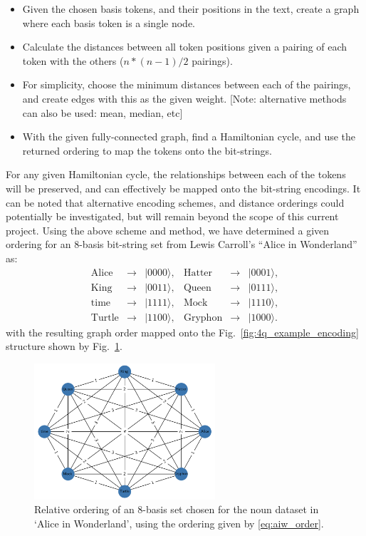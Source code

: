 \begin{itemize}
    \item Given the chosen basis tokens, and their positions in the text, create a graph where each basis token is a single node.
    \item Calculate the distances between all token positions given a pairing of each token with the others ($n*(n-1)/2$ pairings).
    \item For simplicity, choose the minimum distances between each of the pairings, and create edges with this as the given weight. [Note: alternative methods can also be used: mean, median, etc]
    \item With the given fully-connected graph, find a Hamiltonian cycle, and use the returned ordering to map the tokens onto the bit-strings.
\end{itemize}

For any given Hamiltonian cycle, the relationships between each of the tokens will be preserved, and can effectively be mapped onto the bit-string encodings. It can be noted that alternative encoding schemes, and distance orderings could potentially be investigated, but will remain beyond the scope of this current project. Using the above scheme and method, we have determined a given ordering for an 8-basis bit-string set from Lewis Carroll's ``Alice in Wonderland'' as:
\begin{equation}
\begin{array}{cccccc}
\textrm{Alice} & \rightarrow & \vert 0000\rangle, & \textrm{Hatter} & \rightarrow &\vert 0001\rangle, \\
\textrm{King} & \rightarrow & \vert 0011 \rangle, & \textrm{Queen} & \rightarrow &\vert 0111\rangle, \\
\textrm{time} & \rightarrow & \vert 1111 \rangle, &\textrm{Mock} & \rightarrow &\vert 1110\rangle, \\
\textrm{Turtle} & \rightarrow & \vert 1100\rangle, &\textrm{Gryphon} & \rightarrow &\vert 1000\rangle.
\end{array}
\label{eq:aiw_order}
\end{equation}
 with the resulting graph order mapped onto the Fig.~\ref{fig:4q_example_encoding} structure shown by Fig.~\ref{fig:4q_aiw}.

\begin{figure}[htbp]
    \centering
    \includegraphics[width=0.6\textwidth]{Images/4qubitreg_graph_aiw.png}
    \caption{Relative ordering of an 8-basis set chosen for the noun dataset in `Alice in Wonderland', using the ordering given by \eqref{eq:aiw_order}.}
    \label{fig:4q_aiw}
\end{figure}

